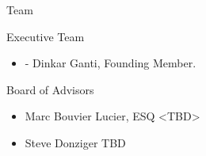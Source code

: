\documentclass[10pt,xcolor={dvipsnames}]{beamer}
\begin{document}
\begin{frame} {Team}
  \begin{block} {Executive Team}
  \begin{itemize}
      \item - Dinkar Ganti, Founding Member.
  \end{itemize}
  \end{block}
  \begin{block} {Board of Advisors}
    \begin{itemize}
      \item Marc Bouvier Lucier, ESQ <TBD>
      \item Steve Donziger TBD
    \end{itemize}
  \end{block}
\end{frame}


{\1
  \begin{frame}
  \end{frame}
}
\end{document}
